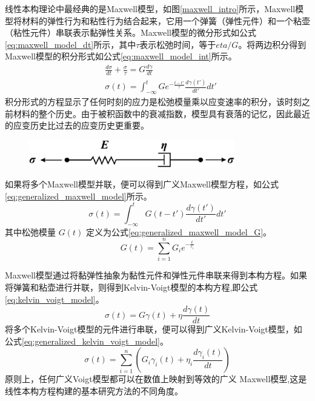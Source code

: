 线性本构理论中最经典的是Maxwell模型\cite{maxwell1867iv}，如图\ref{maxwell_intro}所示，Maxwell模型将材料的弹性行为和粘性行为结合起来，它用一个弹簧（弹性元件）和一个粘壶（粘性元件）串联表示黏弹性关系。Maxwell模型的微分形式如公式\eqref{eq:maxwell_model_dt}所示，其中$\tau$表示松弛时间，等于$eta/G$。将两边积分得到Maxwell模型的积分形式如公式\eqref{eq:maxwell_model_int}所示。
\begin{align}
	 & \frac{d\sigma}{dt} + \frac{\sigma}{\tau}  = G \frac{d\gamma}{dt} \label{eq:maxwell_model_dt}                                                   \\
	 & \sigma(t)                                = \int_{-\infty}^{t} G e^{-\frac{t-t'}{\tau}} \frac{d\gamma(t')}{dt'} dt'\label{eq:maxwell_model_int}
\end{align}
积分形式的方程显示了任何时刻的应力是松弛模量乘以应变速率的积分，该时刻之前材料的整个历史。由于被积函数中的衰减指数，模型具有衰落的记忆，因此最近的应变历史比过去的应变历史更重要。
\begin{figure}[htbp]
	\centering
	\includegraphics[width=0.8\textwidth]{Fig/maxwell_intro.png}
\end{figure}
如果将多个Maxwell模型并联，便可以得到广义Maxwell模型方程，如公式\eqref{eq:generalized_maxwell_model}所示。
\begin{equation}
	\sigma(t) = \int_{-\infty}^{t} G(t-t') \frac{d\gamma(t')}{dt'} dt' \label{eq:generalized_maxwell_model}
\end{equation}
其中松弛模量 \(G(t)\) 定义为公式\eqref{eq:generalized_maxwell_model_G}。
\begin{equation}
	G(t) = \sum_{i=1}^{n} G_i e^{-\frac{t}{\tau_i}} \label{eq:generalized_maxwell_model_G}
\end{equation}

Maxwell模型通过将黏弹性抽象为黏性元件和弹性元件串联来得到本构方程。如果将弹簧和粘壶进行并联，则得到Kelvin-Voigt模型的本构方程,即公式\eqref{eq:kelvin_voigt_model}\cite{voigt1892ueber}。
\begin{equation}
	\sigma(t) = G \gamma(t) + \eta \frac{d\gamma(t)}{dt} \label{eq:kelvin_voigt_model}
\end{equation}
将多个Kelvin-Voigt模型的元件进行串联，便可以得到广义Kelvin-Voigt模型，如公式\eqref{eq:generalized_kelvin_voigt_model}。
\begin{equation}
	\sigma(t) = \sum_{i=1}^{n} \left( G_i \gamma_i(t) + \eta_i \frac{d\gamma_i(t)}{dt} \right)\label{eq:generalized_kelvin_voigt_model}
\end{equation}
原则上，任何广义Voigt模型都可以在数值上映射到等效的广义 Maxwell模型,这是线性本构方程构建的基本研究方法的不同角度\cite{ricarteTutorialReviewLinear2024}。

